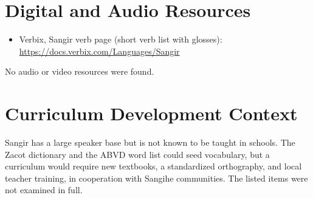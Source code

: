 \documentclass[12pt]{article}
\begin{document}
\section{Digital and Audio Resources}
\begin{itemize}
\item Verbix, Sangir verb page (short verb list with glosses): \url{https://docs.verbix.com/Languages/Sangir}
\end{itemize}
No audio or video resources were found.

\section{Curriculum Development Context}
Sangir has a large speaker base but is not known to be taught in schools. The Zacot dictionary and the ABVD word list could seed vocabulary, but a curriculum would require new textbooks, a standardized orthography, and local teacher training, in cooperation with Sangihe communities. The listed items were not examined in full.
\end{document}
